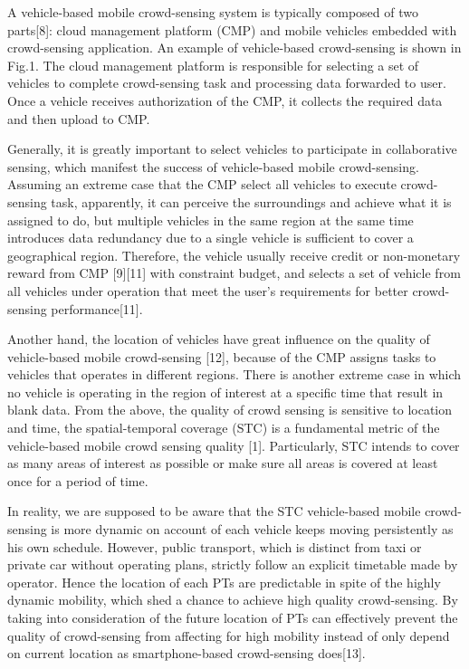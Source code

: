 \documentclass[journal]{IEEEtran}
\begin{document}
A vehicle-based mobile crowd-sensing system is typically composed of two parts[8]: cloud management platform (CMP) and mobile vehicles embedded with crowd-sensing application. An example of vehicle-based crowd-sensing is shown in Fig.1. The cloud management platform is responsible for selecting a set of vehicles to complete crowd-sensing task and processing data forwarded to user. Once a vehicle receives authorization of the CMP, it collects the required data and then upload to CMP.

Generally, it is greatly important to select vehicles to participate in collaborative sensing, which manifest the success of vehicle-based mobile crowd-sensing. Assuming an extreme case that the CMP select all vehicles to execute crowd-sensing task, apparently, it can perceive the surroundings and achieve what it is assigned to do, but multiple vehicles in the same region at the same time introduces data redundancy due to a single vehicle is sufficient to cover a geographical region. Therefore, the vehicle usually receive credit or non-monetary reward from CMP [9][11] with constraint budget, and selects a set of vehicle from all vehicles under operation that meet the user’s requirements for better crowd-sensing performance[11].

Another hand, the location of vehicles have great influence on the quality of vehicle-based mobile crowd-sensing [12], because of the CMP assigns tasks to vehicles that operates in different regions. There is another extreme case in which no vehicle is operating in the region of interest at a specific time that result in blank data. From the above, the quality of crowd sensing is sensitive to location and time, the spatial-temporal coverage (STC) is a fundamental metric of the vehicle-based mobile crowd sensing quality [1]. Particularly, STC intends to cover as many areas of interest as possible or make sure all areas is covered at least once for a period of time.

 In reality, we are supposed to be aware that the STC vehicle-based mobile crowd-sensing is more dynamic on account of each vehicle keeps moving persistently as his own schedule. However, public transport, which is distinct from taxi or private car without operating plans, strictly follow an explicit timetable made by operator. Hence the location of each PTs are predictable in spite of the highly dynamic mobility, which shed a chance to achieve high quality crowd-sensing. By taking into consideration of the future location of PTs can effectively prevent the quality of crowd-sensing from affecting for high mobility instead of only depend on current location as smartphone-based crowd-sensing does[13].
\end{document}
